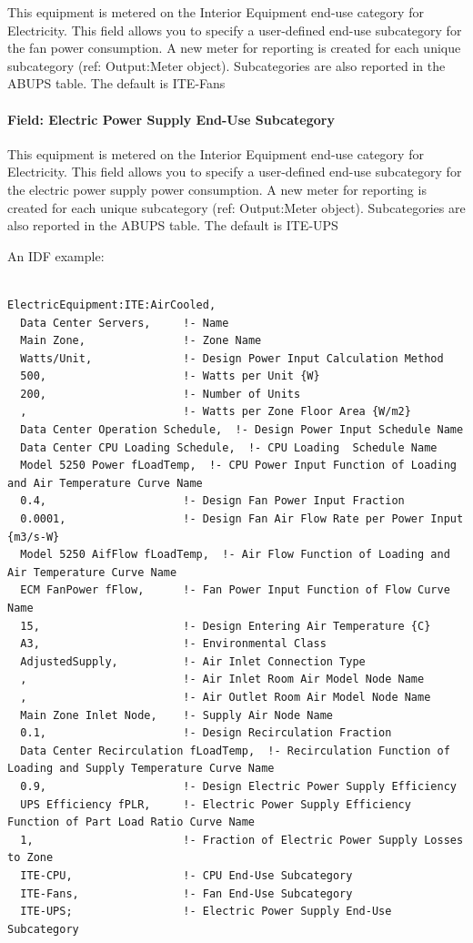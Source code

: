 This equipment is metered on the Interior Equipment end-use category for Electricity. This field allows you to specify a user-defined end-use subcategory for the fan power consumption. A new meter for reporting is created for each unique subcategory (ref: Output:Meter object). Subcategories are also reported in the ABUPS table. The default is ITE-Fans

\paragraph{Field: Electric Power Supply End-Use Subcategory}\label{field-electric-power-supply-end-use-subcategory}

This equipment is metered on the Interior Equipment end-use category for Electricity. This field allows you to specify a user-defined end-use subcategory for the electric power supply power consumption. A new meter for reporting is created for each unique subcategory (ref: Output:Meter object). Subcategories are also reported in the ABUPS table. The default is ITE-UPS

An IDF example:

\begin{lstlisting}

ElectricEquipment:ITE:AirCooled,
  Data Center Servers,     !- Name
  Main Zone,               !- Zone Name
  Watts/Unit,              !- Design Power Input Calculation Method
  500,                     !- Watts per Unit {W}
  200,                     !- Number of Units
  ,                        !- Watts per Zone Floor Area {W/m2}
  Data Center Operation Schedule,  !- Design Power Input Schedule Name
  Data Center CPU Loading Schedule,  !- CPU Loading  Schedule Name
  Model 5250 Power fLoadTemp,  !- CPU Power Input Function of Loading and Air Temperature Curve Name
  0.4,                     !- Design Fan Power Input Fraction
  0.0001,                  !- Design Fan Air Flow Rate per Power Input {m3/s-W}
  Model 5250 AifFlow fLoadTemp,  !- Air Flow Function of Loading and Air Temperature Curve Name
  ECM FanPower fFlow,      !- Fan Power Input Function of Flow Curve Name
  15,                      !- Design Entering Air Temperature {C}
  A3,                      !- Environmental Class
  AdjustedSupply,          !- Air Inlet Connection Type
  ,                        !- Air Inlet Room Air Model Node Name
  ,                        !- Air Outlet Room Air Model Node Name
  Main Zone Inlet Node,    !- Supply Air Node Name
  0.1,                     !- Design Recirculation Fraction
  Data Center Recirculation fLoadTemp,  !- Recirculation Function of Loading and Supply Temperature Curve Name
  0.9,                     !- Design Electric Power Supply Efficiency
  UPS Efficiency fPLR,     !- Electric Power Supply Efficiency Function of Part Load Ratio Curve Name
  1,                       !- Fraction of Electric Power Supply Losses to Zone
  ITE-CPU,                 !- CPU End-Use Subcategory
  ITE-Fans,                !- Fan End-Use Subcategory
  ITE-UPS;                 !- Electric Power Supply End-Use Subcategory
\end{lstlisting}

